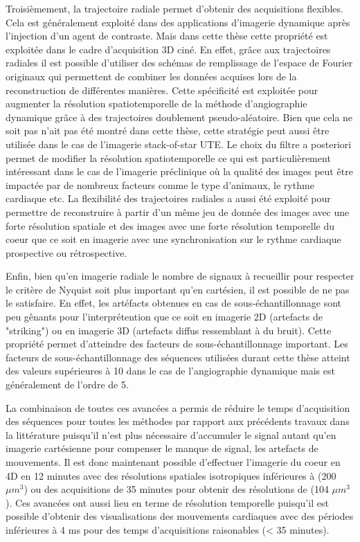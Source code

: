 Troisièmement, la trajectoire radiale permet d'obtenir des acquisitions flexibles. Cela est généralement exploité dans des applications d'imagerie dynamique après l'injection d'un agent de contraste. Mais dans cette thèse cette propriété est exploitée dans le cadre d'acquisition 3D ciné. En effet, grâce aux trajectoires radiales il est possible d'utiliser des schémas de remplissage de l'espace de Fourier originaux qui permettent de combiner les données acquises lors de la reconstruction de différentes manières. Cette spécificité est exploitée pour augmenter la résolution spatiotemporelle de la méthode d'angiographie dynamique grâce à des trajectoires doublement pseudo-aléatoire. Bien que cela ne soit pas n'ait pas été montré dans cette thèse, cette stratégie peut aussi être utilisée dans le cas de l'imagerie stack-of-star UTE. Le choix du filtre a posteriori permet de modifier la résolution spatiotemporelle ce qui est particulièrement intéressant dans le cas de l'imagerie préclinique où la qualité des images peut être impactée par de nombreux facteurs comme le type d'animaux, le rythme cardiaque etc. La flexibilité des trajectoires radiales a aussi été exploité pour permettre de reconstruire à partir d'un même jeu de donnée des images avec une forte résolution spatiale et des images avec une forte résolution temporelle du coeur que ce soit en imagerie avec une synchronisation sur le rythme cardiaque prospective ou rétrospective.

Enfin, bien qu'en imagerie radiale le nombre de signaux à recueillir pour respecter le critère de Nyquist soit plus important qu'en cartésien, il est possible de ne pas le satisfaire. En effet, les artéfacts obtenues en cas de sous-échantillonnage sont peu gênants pour l'interprétention que ce soit en imagerie 2D (artefacts de "striking") ou en imagerie 3D (artefacts diffus ressemblant à du bruit). Cette propriété permet d'atteindre des facteurs de sous-échantillonnage important. Les facteurs de sous-échantillonnage des séquences utilisées durant cette thèse atteint des valeurs supérieures à 10 dans le cas de l'angiographie dynamique mais est généralement de l'ordre de 5.

La combinaison de toutes ces avancées a permis de réduire le temps d'acquisition des séquences pour toutes les méthodes par rapport aux précédents travaux dans la littérature puisqu'il n'est plus nécessaire d'accumuler le signal autant qu'en imagerie cartésienne pour compenser le manque de signal, les artefacts de mouvements. 
Il est donc maintenant possible d'effectuer l'imagerie du coeur en 4D en 12 minutes avec des résolutions spatiales isotropiques inférieures à (200 $\mu m^3$) ou des acquisitions de 35 minutes pour obtenir des résolutions de (104 $\mu m^3$). 
Ces avancées ont aussi lieu en terme de résolution temporelle puisqu'il est possible d'obtenir des visualisations des mouvements cardiaques avec des périodes inférieures à 4 ms pour des temps d'acquisitions raisonables (< 35 minutes).

